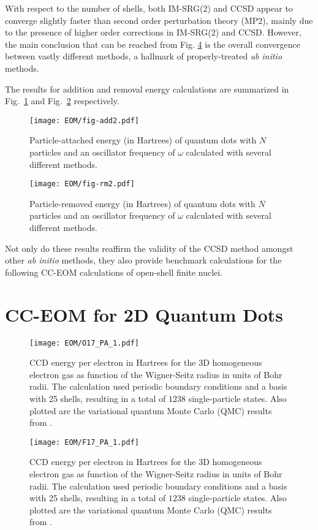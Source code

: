 \documentclass[thesis.tex]{subfiles}
\begin{document}
With respect to the number of shells, both IM-SRG(2) and CCSD appear to converge slightly faster than second order perturbation theory (MP2), mainly due to the presence of higher order corrections in IM-SRG(2) and CCSD.  However, the main conclusion that can be reached from Fig. \ref{fig:QDground} is the overall convergence between vastly different methods, a hallmark of properly-treated \emph{ab initio} methods.

The results for addition and removal energy calculations are summarized in Fig.\ \ref{fig:QDadd} and Fig.\ \ref{fig:QDrm} respectively.
\begin{figure}
  \centering
  \texttt{[image: EOM/fig-add2.pdf]}
  \caption{Particle-attached energy (in Hartrees) of quantum dots with $N$ particles and an oscillator frequency of $\omega$ calculated with several different methods.}
  \label{fig:QDadd}
\end{figure}

\begin{figure}
  \centering
  \texttt{[image: EOM/fig-rm2.pdf]}
  \caption{Particle-removed energy (in Hartrees) of quantum dots with $N$ particles and an oscillator frequency of $\omega$ calculated with several different methods.}
  \label{fig:QDrm}
\end{figure}

Not only do these results reaffirm the validity of the CCSD method amongst other \emph{ab initio} methods, they also provide benchmark calculations for the following CC-EOM calculations of open-shell finite nuclei.


\section{CC-EOM for 2D Quantum Dots} \label{section:eom_target_states}

\begin{figure}[h]
  \texttt{[image: EOM/O17\_PA\_1.pdf]}
  \caption{CCD energy per electron in Hartrees for the 3D homogeneous electron gas as function of the Wigner-Seitz radius in units of Bohr radii. The calculation used periodic boundary conditions and a basis with 25 shells, resulting in a total of $1238$ single-particle states. Also plotted are the variational quantum Monte Carlo (QMC) results from \cite{LOPEZ2006}.}
  \label{fig:QDground}
\end{figure}

\begin{figure}[h]
  \texttt{[image: EOM/F17\_PA\_1.pdf]}
  \caption{CCD energy per electron in Hartrees for the 3D homogeneous electron gas as function of the Wigner-Seitz radius in units of Bohr radii. The calculation used periodic boundary conditions and a basis with 25 shells, resulting in a total of $1238$ single-particle states. Also plotted are the variational quantum Monte Carlo (QMC) results from \cite{LOPEZ2006}.}
  \label{fig:QDground}
\end{figure}
\end{document}
